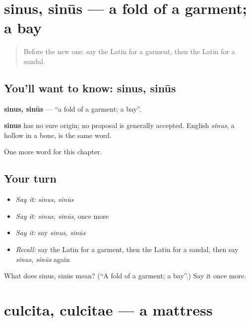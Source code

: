 \section[sinus, sinūs]{sinus, sinūs — a fold of a garment; a bay}

\label{lesson:LA-C225-sinus}



\begin{quote}
Before the new one: say the Latin for a garment, then the Latin for a sandal.
\end{quote}

\subsection*{You'll want to know: sinus, sinūs}
\textbf{sinus, sinūs} — \textquotedblleft{}a fold of a garment; a bay\textquotedblright{}.

\begin{cousinweb}
\textbf{sinus} has no sure origin; no proposal is generally accepted. English \emph{sinus}, a hollow in a bone, is the same word.
\end{cousinweb}

\begin{grammarlens}[title={What you've built}]
One more word for this chapter.
\end{grammarlens}

\subsection*{Your turn}
\begin{itemize}
\raggedright
  \item \emph{Say it:} \emph{sinus, sinūs}
  \item \emph{Say it:} \emph{sinus, sinūs}, once more
  \item \emph{Say it:} say \emph{sinus, sinūs}
  \item \emph{Recall:} say the Latin for a garment, then the Latin for a sandal, then say \emph{sinus, sinūs} again
\end{itemize}

\begin{tcolorbox}[breakable,colback=teal!4,colframe=teal!35!black,title={Before you move on}]
What does sinus, sinūs mean? (\textquotedblleft{}A fold of a garment; a bay\textquotedblright{}.) Say it once more.
\end{tcolorbox}
\section[culcita, culcitae]{culcita, culcitae — a mattress}

